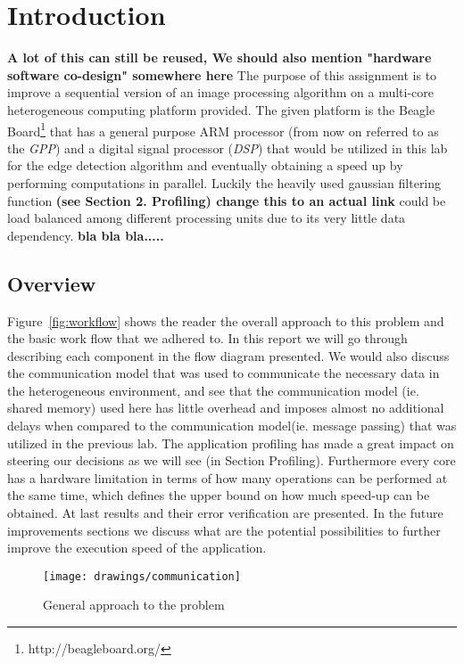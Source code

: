 \newpage

\section{Introduction}
\textbf{A lot of this can still be reused,  We should also mention "hardware software co-design" somewhere here}
The purpose of this assignment is to improve a sequential version of an image processing algorithm on a multi-core heterogeneous computing platform provided. The given platform is the Beagle Board\footnote{http://beagleboard.org/} that has a general purpose ARM processor (from now on referred to as the \emph{GPP}) and a digital signal processor (\emph{DSP}) that would be utilized in this lab for the edge detection algorithm and eventually obtaining a speed up by performing computations in parallel. Luckily the heavily used gaussian filtering function \textbf{(see Section 2. Profiling) change this to an actual link} could be load balanced among different processing units due to its very little data dependency. \textbf{bla bla bla..... }

\subsection{Overview}
Figure~\ref{fig:workflow} shows the reader the overall approach to this problem and the basic work flow that we adhered to. In this report we will go through describing each component in the flow diagram presented. We would also discuss the communication model that was used to communicate the necessary data in the heterogeneous environment, and see that the communication model (ie. shared memory) used here has little overhead and imposes almost no additional delays when compared to the communication model(ie. message passing) that was utilized in the previous lab. The application profiling has made a great impact on steering our decisions as we will see (in Section Profiling). Furthermore every core has a hardware limitation in terms of how many operations can be performed at the same time, which defines the upper bound on how much speed-up can be obtained. At last results and their error verification are presented. In the future improvements sections we discuss what are the potential possibilities to further improve the execution speed of the application.

\begin{figure*}
\texttt{[image: drawings/communication]}
\caption{General approach to the problem}
\label{fig:smnsmn}
\end{figure*}


